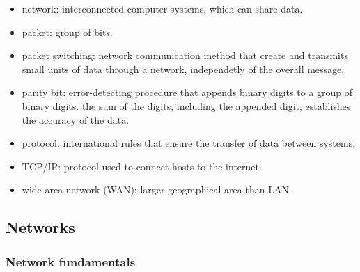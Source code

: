 \documentclass{article}
\begin{document}
\begin{itemize}
    \item network: interconnected computer systems, which can share data.
    \item packet: group of bits.
    \item packet switching: network communication method that create and
        transmits small units of data through a network, independetly of the
        overall message.
    \item parity bit: error-detecting procedure that appends binary digits to
        a group of binary digits. the sum of the digits, including the appended
        digit, establishes the accuracy of the data.
    \item protocol: international rules that ensure the transfer of data
        between systems.
    \item TCP/IP: protocol used to connect hosts to the internet.
    \item wide area network (WAN): larger geographical area than LAN.
\end{itemize}

\subsection{Networks}

\subsubsection{Network fundamentals}
\end{document}
